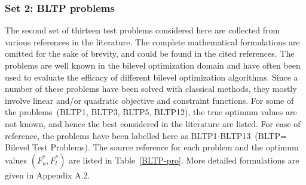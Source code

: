 \subsubsection{Set 2: BLTP problems}
\label{test-others}

The second set of thirteen test problems considered here are collected from various references in the literature. The complete mathematical formulations are omitted for the sake of brevity, and could be found in the cited references. The problems are well known in the bilevel optimization domain and have often been used to evaluate the efficacy of different bilevel optimization algorithms. Since a number of these problems have been solved with classical methods, they mostly involve linear and/or quadratic objective and constraint functions. For some of the problems~(BLTP1, BLTP3, BLTP5, BLTP12), the true optimum values are not known, and hence the best considered in the literature are listed. For ease of reference, the problems have been labelled here as BLTP1-BLTP13~(BLTP= Bilevel Test Problems). The source reference for each problem and the optimum values $(F_u^{*},F_l^{*})$ are listed in Table~\ref{BLTP-pro}. More detailed formulations are given in Appendix A.2.


